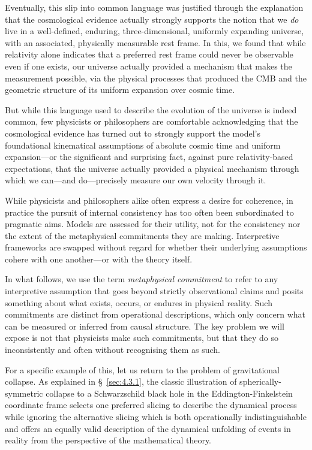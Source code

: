 \documentclass[12pt]{book}
\begin{document}
Eventually, this slip into common language was justified through the explanation that the cosmological evidence actually strongly supports the notion that we \textit{do} live in a well-defined, enduring, three-dimensional, uniformly expanding universe, with an associated, physically measurable rest frame. In this, we found that while relativity alone indicates that a preferred rest frame could never be observable even if one exists, our universe actually provided a mechanism that makes the measurement possible, via the physical processes that produced the CMB and the geometric structure of its uniform expansion over cosmic time. 

But while this language used to describe the evolution of the universe is indeed common, few physicists or philosophers are comfortable acknowledging that the cosmological evidence has turned out to strongly support the model's foundational kinematical assumptions of absolute cosmic time and uniform expansion---or the significant and surprising fact, against pure relativity-based expectations, that the universe actually provided a physical mechanism through which we can---and do---precisely measure our own velocity through it.

While physicists and philosophers alike often express a desire for coherence, in practice the pursuit of internal consistency has too often been subordinated to pragmatic aims. Models are assessed for their utility, not for the consistency nor the extent of the metaphysical commitments they are making. Interpretive frameworks are swapped without regard for whether their underlying assumptions cohere with one another---or with the theory itself. 

In what follows, we use the term \textit{metaphysical commitment} to refer to any interpretive assumption that goes beyond strictly observational claims and posits something about what exists, occurs, or endures in physical reality. Such commitments are distinct from operational descriptions, which only concern what can be measured or inferred from causal structure. The key problem we will expose is not that physicists make such commitments, but that they do so inconsistently and often without recognising them as such.

For a specific example of this, let us return to the problem of gravitational collapse. As explained in \S~\ref{sec:4.3.1}, the classic illustration of spherically-symmetric collapse to a Schwarzschild black hole in the Eddington-Finkelstein coordinate frame selects one preferred slicing to describe the dynamical process while ignoring the alternative slicing which is both operationally indistinguishable and offers an equally valid description of the dynamical unfolding of events in reality from the perspective of the mathematical theory.
\end{document}
